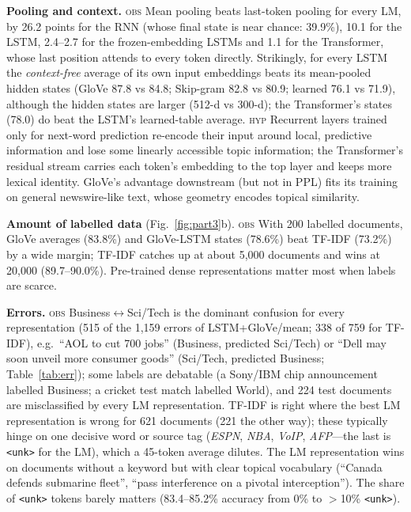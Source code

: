 \documentclass[10pt,a4paper]{article}
\newcommand{\obs}{\textsc{obs}}
\newcommand{\hyp}{\textsc{hyp}}
\begin{document}
\textbf{Pooling and context.} \obs{} Mean pooling beats last-token pooling for every LM, by 26.2 points for
the RNN (whose final state is near chance: 39.9\%), 10.1 for the LSTM, 2.4--2.7 for the frozen-embedding LSTMs
and 1.1 for the Transformer, whose last position attends to every token directly. Strikingly, for every LSTM
the \emph{context-free} average of its own input embeddings beats its mean-pooled hidden states (GloVe 87.8 vs
84.8; Skip-gram 82.8 vs 80.9; learned 76.1 vs 71.9), although the hidden states are larger (512-d vs 300-d);
the Transformer's states (78.0) do beat the LSTM's learned-table average. \hyp{} Recurrent layers trained only
for next-word prediction re-encode their input around local, predictive information and lose some
linearly accessible topic information; the Transformer's residual stream carries each token's embedding to the
top layer and keeps more lexical identity. GloVe's advantage downstream (but not in PPL) fits its training on
general newswire-like text, whose geometry encodes topical similarity.

\textbf{Amount of labelled data} (Fig.~\ref{fig:part3}b). \obs{} With 200 labelled documents, GloVe averages
(83.8\%) and GloVe-LSTM states (78.6\%) beat TF-IDF (73.2\%) by a wide margin; TF-IDF catches up at about
5,000 documents and wins at 20,000 (89.7--90.0\%). Pre-trained dense representations matter most when labels
are scarce.

\textbf{Errors.} \obs{} Business$\leftrightarrow$Sci/Tech is the dominant confusion for every representation
(515 of the 1,159 errors of LSTM+GloVe/mean; 338 of 759 for TF-IDF), e.g.\ ``AOL to cut 700 jobs'' (Business,
predicted Sci/Tech) or ``Dell may soon unveil more consumer goods'' (Sci/Tech, predicted Business;
Table~\ref{tab:err}); some labels are debatable (a Sony/IBM chip announcement labelled Business; a cricket test match labelled World), and 224
test documents are misclassified by every LM representation. TF-IDF is right where the best LM representation
is wrong for 621 documents (221 the other way); these typically hinge on one decisive word or source tag
(\emph{ESPN}, \emph{NBA}, \emph{VoIP}, \emph{AFP}---the last is \texttt{<unk>} for the LM), which a 45-token
average dilutes. The LM representation wins on documents without a keyword but with clear topical vocabulary
(``Canada defends submarine fleet'', ``pass interference on a pivotal interception''). The share of
\texttt{<unk>} tokens barely matters (83.4--85.2\% accuracy from 0\% to $>$10\% \texttt{<unk>}).
\end{document}
